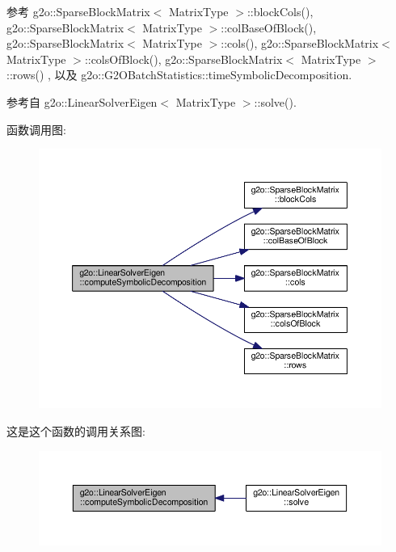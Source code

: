 参考 g2o\-::\-Sparse\-Block\-Matrix$<$ Matrix\-Type $>$\-::block\-Cols(), g2o\-::\-Sparse\-Block\-Matrix$<$ Matrix\-Type $>$\-::col\-Base\-Of\-Block(), g2o\-::\-Sparse\-Block\-Matrix$<$ Matrix\-Type $>$\-::cols(), g2o\-::\-Sparse\-Block\-Matrix$<$ Matrix\-Type $>$\-::cols\-Of\-Block(), g2o\-::\-Sparse\-Block\-Matrix$<$ Matrix\-Type $>$\-::rows() , 以及 g2o\-::\-G2\-O\-Batch\-Statistics\-::time\-Symbolic\-Decomposition.



参考自 g2o\-::\-Linear\-Solver\-Eigen$<$ Matrix\-Type $>$\-::solve().



函数调用图\-:
\nopagebreak
\begin{figure}[H]
\begin{center}
\leavevmode
\includegraphics[width=350pt]{classg2o_1_1LinearSolverEigen_a12307526d419d194620e982d8c683767_cgraph}
\end{center}
\end{figure}




这是这个函数的调用关系图\-:
\nopagebreak
\begin{figure}[H]
\begin{center}
\leavevmode
\includegraphics[width=350pt]{classg2o_1_1LinearSolverEigen_a12307526d419d194620e982d8c683767_icgraph}
\end{center}
\end{figure}


